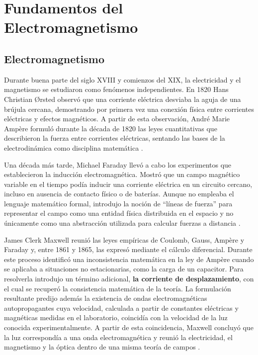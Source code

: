 \section{Fundamentos del Electromagnetismo}

\subsection{Electromagnetismo}
Durante buena parte del siglo XVIII y comienzos del XIX, la electricidad y el magnetismo se estudiaron como fenómenos independientes. En 1820 Hans Christian Ørsted observó que una corriente eléctrica desviaba la aguja de una brújula cercana, demostrando por primera vez una conexión física entre corrientes eléctricas y efectos magnéticos. A partir de esta observación, André Marie Ampère formuló durante la década de 1820 las leyes cuantitativas que describieron la fuerza entre corrientes eléctricas, sentando las bases de la electrodinámica como disciplina matemática \cite{Hon2020}.

Una década más tarde, Michael Faraday llevó a cabo los experimentos que establecieron la inducción electromagnética. Mostró que un campo magnético variable en el tiempo podía inducir una corriente eléctrica en un circuito cercano, incluso en ausencia de contacto físico o de baterías. Aunque no empleaba el lenguaje matemático formal, introdujo la noción de ``líneas de fuerza'' para representar el campo como una entidad física distribuida en el espacio y no únicamente como una abstracción utilizada para calcular fuerzas a distancia \cite{Hon2020}.

James Clerk Maxwell reunió las leyes empíricas de Coulomb, Gauss, Ampère y Faraday y, entre 1861 y 1865, las expresó mediante el cálculo diferencial. Durante este proceso identificó una inconsistencia matemática en la ley de Ampère cuando se aplicaba a situaciones no estacionarias, como la carga de un capacitor. Para resolverla introdujo un término adicional, \textbf{la corriente de desplazamiento}, con el cual se recuperó la consistencia matemática de la teoría. La formulación resultante predijo además la existencia de ondas electromagnéticas autopropagantes cuya velocidad, calculada a partir de constantes eléctricas y magnéticas medidas en el laboratorio, coincidía con la velocidad de la luz conocida experimentalmente. A partir de esta coincidencia, Maxwell concluyó que la luz correspondía a una onda electromagnética y reunió la electricidad, el magnetismo y la óptica dentro de una misma teoría de campos \cite{Hon2020}.

